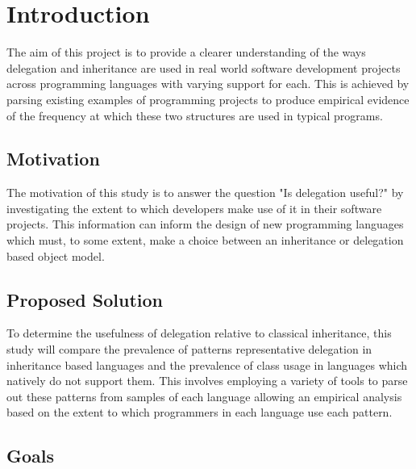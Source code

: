 \chapter{Introduction}\label{C:intro}
The aim of this project is to provide a clearer understanding of the ways delegation and inheritance are used in real world software development projects across programming languages with varying support for each. This is achieved by parsing existing examples of programming projects to produce empirical evidence of the frequency at which these two structures are used in typical programs.

\section{Motivation}
The motivation of this study is to answer the question "Is delegation useful?" by investigating the extent to which developers make use of it in their software projects. This information can inform the design of new programming languages which must, to some extent, make a choice between an inheritance or delegation based object model.

\section{Proposed Solution}
To determine the usefulness of delegation relative to classical inheritance, this study will compare the prevalence of patterns representative delegation in inheritance based languages and the prevalence of class usage in languages which natively do not support them. This involves employing a variety of tools to parse out these patterns from samples of each language allowing an empirical analysis based on the extent to which programmers in each language use each pattern.

\section{Goals}
